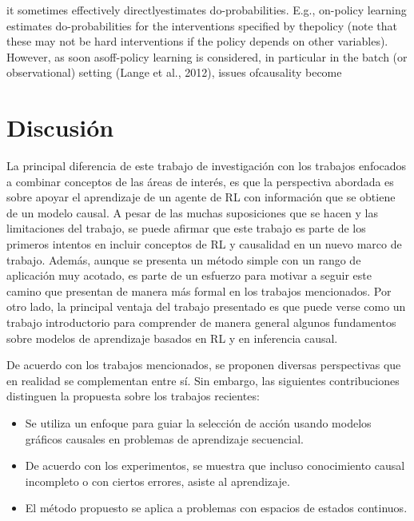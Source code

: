 it sometimes effectively directlyestimates do-probabilities.  E.g., on-policy learning estimates do-probabilities for the interventions specified by thepolicy (note that these may not be hard interventions if the policy depends on other variables). However, as soon asoff-policy learning is considered, in particular in the batch (or observational) setting (Lange et al., 2012), issues ofcausality become

\section{Discusión}



La principal diferencia de este trabajo de investigación con los trabajos enfocados a combinar conceptos de las áreas de interés, es que la perspectiva abordada es sobre apoyar el aprendizaje de un agente de RL con información que se obtiene de un modelo causal. A pesar de las muchas suposiciones que se hacen y las limitaciones del trabajo, se puede afirmar que este trabajo es parte de los primeros intentos en incluir conceptos de RL y causalidad en un nuevo marco de trabajo. Además, aunque se presenta un método simple con un rango de aplicación muy acotado, es parte de un esfuerzo para motivar a seguir este camino que presentan de manera más formal en los trabajos mencionados. Por otro lado, la principal ventaja del trabajo presentado es que puede verse como un trabajo introductorio para comprender de manera general algunos fundamentos sobre modelos de aprendizaje basados en RL y en inferencia causal.

De acuerdo con los trabajos mencionados, se proponen diversas perspectivas que en realidad se complementan entre sí. Sin embargo, las siguientes contribuciones distinguen
la propuesta sobre los trabajos recientes:

\begin{itemize}
    \item Se utiliza un enfoque para guiar la selección de acción usando modelos gráficos causales en problemas de aprendizaje secuencial.
    \item De acuerdo con los experimentos, se muestra que incluso conocimiento causal incompleto o con ciertos errores, asiste al aprendizaje.
    \item  El método propuesto se aplica a problemas con espacios de estados continuos.
\end{itemize}


